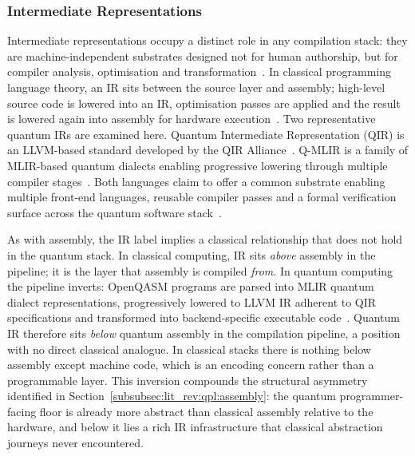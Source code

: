 \subsubsection{Intermediate Representations}\label{subsubsec:lit_rev:qpl:ir}
Intermediate representations occupy a distinct role in any compilation stack: they are machine-independent substrates designed not for human authorship, but for compiler analysis, optimisation and transformation~\cite{scott2009plp, irreview2024}.
In classical programming language theory, an IR sits between the source layer and assembly; high-level source code is lowered into an IR, optimisation passes are applied and the result is lowered again into assembly for hardware execution~\cite{scott2009plp}.
Two representative quantum IRs are examined here.
Quantum Intermediate Representation (QIR) is an LLVM-based standard developed by the QIR Alliance~\cite{qiralliance_spec}.
Q-MLIR is a family of MLIR-based quantum dialects enabling progressive lowering through multiple compiler stages~\cite{McCaskey2021MLIRDialectQASM}.
Both languages claim to offer a common substrate enabling multiple front-end languages, reusable compiler passes and a formal verification surface across the quantum software stack~\cite{irreview2024}.

As with assembly, the IR label implies a classical relationship that does not hold in the quantum stack.
In classical computing, IR sits \textit{above} assembly in the pipeline; it is the layer that assembly is compiled \textit{from}.
In quantum computing the pipeline inverts: OpenQASM programs are parsed into MLIR quantum dialect representations, progressively lowered to LLVM IR adherent to QIR specifications and transformed into backend-specific executable code~\cite{McCaskey2021MLIRDialectQASM}.
Quantum IR therefore sits \textit{below} quantum assembly in the compilation pipeline, a position with no direct classical analogue.
In classical stacks there is nothing below assembly except machine code, which is an encoding concern rather than a programmable layer.
This inversion compounds the structural asymmetry identified in Section~\ref{subsubsec:lit_rev:qpl:assembly}: the quantum programmer-facing floor is already more abstract than classical assembly relative to the hardware, and below it lies a rich IR infrastructure that classical abstraction journeys never encountered.

